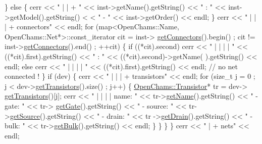 \begin{DoxyCodeInclude}
            \} \textcolor{keywordflow}{else} \{
                cerr << \textcolor{stringliteral}{" | | + "} << inst->getName().getString() << \textcolor{stringliteral}{" : "} << inst->getModel().getString() <
      < \textcolor{stringliteral}{" - "} << inst->getOrder() << endl;
            \}
            cerr << \textcolor{stringliteral}{" | | | + connectors"} << endl;
            \textcolor{keywordflow}{for} (map<OpenChams::Name, OpenChams::Net*>::const\_iterator cit = inst->
      \hyperlink{class_open_chams_1_1_instance_a745fe0a50eb770ce3bea36ef0e62c8ca}{getConnectors}().begin() ; cit != inst->\hyperlink{class_open_chams_1_1_instance_a745fe0a50eb770ce3bea36ef0e62c8ca}{getConnectors}().end() ; ++cit) \{
                \textcolor{keywordflow}{if} ((*cit).second)
                    cerr << \textcolor{stringliteral}{" | | | | "} << ((*cit).first).getString() << \textcolor{stringliteral}{" : "} << ((*cit).second)->getName(
      ).getString() << endl;
                \textcolor{keywordflow}{else}
                    cerr << \textcolor{stringliteral}{" | | | | "} << ((*cit).first).getString() << endl; \textcolor{comment}{// no net connected !}
            \}
            \textcolor{keywordflow}{if} (dev) \{
                cerr << \textcolor{stringliteral}{" | | | + transistors"} << endl;
                \textcolor{keywordflow}{for} (\textcolor{keywordtype}{size\_t} j = 0 ; j < dev->\hyperlink{class_open_chams_1_1_device_a4033525cab6387eb057f71f5feed9802}{getTransistors}().size() ; j++) \{
                    \hyperlink{class_open_chams_1_1_transistor}{OpenChams::Transistor}* tr = dev->
      \hyperlink{class_open_chams_1_1_device_a4033525cab6387eb057f71f5feed9802}{getTransistors}()[j];
                    cerr << \textcolor{stringliteral}{" | | | | name: "} <<  tr->\hyperlink{class_open_chams_1_1_transistor_a2858c0c4e8b5108f041237cf5a802029}{getName}().getString() << \textcolor{stringliteral}{" - gate: "} << tr->
      \hyperlink{class_open_chams_1_1_transistor_a99f1449aa735ff6cb4927b4f6aa34d9d}{getGate}().getString() << \textcolor{stringliteral}{" - source: "} << tr->\hyperlink{class_open_chams_1_1_transistor_aee4d52a0b13e6db247c1a6c051aede25}{getSource}().getString() << \textcolor{stringliteral}{" - drain: "} << tr
      ->\hyperlink{class_open_chams_1_1_transistor_a62ea0998b3a61310a8331873f5bcce58}{getDrain}().getString() << \textcolor{stringliteral}{" - bulk: "} << tr->\hyperlink{class_open_chams_1_1_transistor_a27ba43f825f9243556ec65d306a2b1a7}{getBulk}().getString() << endl;
                \}
            \}
        \}
    \}
    cerr << \textcolor{stringliteral}{" | + nets"} << endl;

\end{DoxyCodeInclude}
